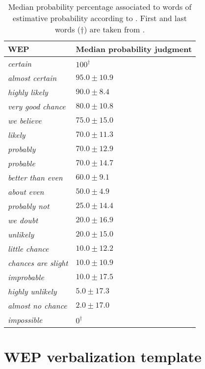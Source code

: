 \documentclass[11pt]{article}
\begin{document}
\vspace{-0.1cm}
\begin{table}[H]
\begin{center}
\begin{tabular}{ll}
\toprule
WEP & \hspace*{-0.8cm}Median probability judgment\\
\midrule
\textit{certain}            &  $100^{\dag}$  \\
\textit{almost certain}     &  $95.0\pm10.9$  \\
\textit{highly likely}      &   $90.0\pm8.4$  \\
\textit{very good chance}   &  $80.0\pm10.8$  \\
\textit{we believe}         &  $75.0\pm15.0$  \\
\textit{likely}             &  $70.0\pm11.3$  \\
\textit{probably}           &  $70.0\pm12.9$  \\
\textit{probable}           &  $70.0\pm14.7$  \\
\textit{better than even}   &   $60.0\pm9.1$  \\
\textit{about even}         &   $50.0\pm4.9$  \\
\textit{probably not}       &  $25.0\pm14.4$  \\
\textit{we doubt}           &  $20.0\pm16.9$  \\
\textit{unlikely}           &  $20.0\pm15.0$  \\
\textit{little chance}      &  $10.0\pm12.2$  \\
\textit{chances are slight} &  $10.0\pm10.9$  \\
\textit{improbable}         &  $10.0\pm17.5$  \\
\textit{highly unlikely}    &   $5.0\pm17.3$  \\
\textit{almost no chance}   &   $2.0\pm17.0$  \\
\textit{impossible}         &    $0^{\dag}$  \\
\bottomrule
\end{tabular}
\end{center}
\caption{Median probability percentage associated to words of estimative probability according to \cite{fagen-ulmschneider}. First and last words ($\dag$) are taken from \cite{kent1964words}. \label{tab:probs}}
\end{table}



\section{WEP verbalization template\label{sec:appendix}}
\end{document}
